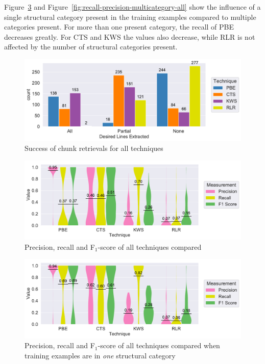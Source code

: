 \documentclass[\myrootdir/main.tex]{subfiles}
\begin{document}
Figure~\ref{fig:recall-precision-singlecategory-all} and Figure~\ref{fig:recall-precision-multicategory-all} show the influence of a single structural category present in the training examples compared to multiple categories present.
For more than one present category, the recall of PBE decreases greatly.
For CTS and KWS the values also decrease, while RLR is not affected by the number of structural categories present.

\begin{figure}[htbp]
		\centering
		\includegraphics[width=\textwidth, clip]{img/big-study/success-partial-all.pdf}
		\caption{Success of chunk retrievals for all techniques}
		\label{fig:success-partial-all}
\end{figure}

\begin{figure}[htbp]
		\centering
		\includegraphics[width=\textwidth, clip]{img/big-study/recall-precision-all.pdf}
		\caption{Precision, recall and F$_{1}$-score of all techniques compared}
		\label{fig:recall-precision-all}
\end{figure}

\begin{figure}[htbp]
	\centering
		\includegraphics[width=\textwidth, clip]{img/big-study/recall-precision-singlecategory-all.pdf}
		\caption{Precision, recall and F$_{1}$-score of all techniques compared when training examples are in \emph{one} structural category}
		\label{fig:recall-precision-singlecategory-all}
\end{figure}
\end{document}
